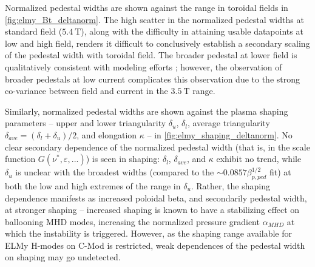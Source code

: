 Normalized pedestal widths are shown against the range in toroidal fields in \cref{fig:elmy_Bt_deltanorm}.  The high scatter in the normalized pedestal widths at standard field ($\SI{5.4}{\tesla}$), along with the difficulty in attaining usable datapoints at low and high field, renders it difficult to conclusively establish a secondary scaling of the pedestal width with toroidal field.  The broader pedestal at lower field is qualitatively consistent with modeling efforts \cite{Maggi2010,Chang2004}; however, the observation of broader pedestals at low current \cite{Hughes2007} complicates this observation due to the strong co-variance between field and current in the $\SI{3.5}{\tesla}$ range.

Similarly, normalized pedestal widths are shown against the plasma shaping parameters -- upper and lower triangularity $\delta_u$, $\delta_l$, average triangularity $\delta_{ave} = (\delta_l + \delta_u)/2$, and elongation $\kappa$ -- in \cref{fig:elmy_shaping_deltanorm}.  No clear secondary dependence of the normalized pedestal width (that is, in the scale function $G(\nu^*,\varepsilon,...)$) is seen in shaping: $\delta_l$, $\delta_{ave}$, and $\kappa$ exhibit no trend, while $\delta_u$ is unclear with the broadest widths (compared to the $\sim 0.0857 \beta_{p,ped}^{1/2}$ fit) at both the low and high extremes of the range in $\delta_u$.  Rather, the shaping dependence manifests as increased poloidal beta, and secondarily pedestal width, at stronger shaping -- increased shaping is known to have a stabilizing effect on ballooning MHD modes, increasing the normalized pressure gradient $\alpha_{MHD}$ at which the instability is triggered.  However, as the shaping range available for ELMy H-modes on C-Mod is restricted, weak dependences of the pedestal width on shaping may go undetected.

\begin{figure}[t]
 \pushtooutside
\end{figure}

